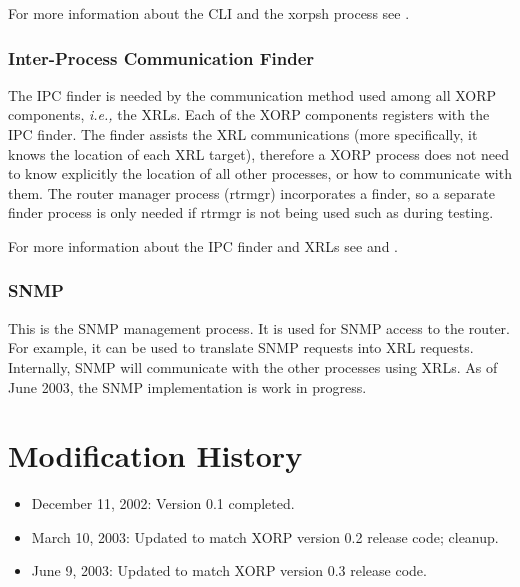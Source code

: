 \documentclass[11pt]{article}
\newcommand{\ie}{\emph{i.e.,}\xspace}
\begin{document}
For more information about the CLI and the xorpsh process see
\cite{xorp:rtrmgr}.

\subsubsection{Inter-Process Communication Finder}

The IPC finder is needed by the communication method used among all
XORP components, \ie the XRLs. Each of the XORP components registers
with the IPC finder. The finder assists the XRL communications (more
specifically, it knows the location of each XRL target), therefore a
XORP process does not need to know explicitly the location of all
other processes, or how to communicate with them.  The router manager
process (rtrmgr) incorporates a finder, so a separate finder process
is only needed if rtrmgr is not being used such as during testing.

For more information about the IPC finder and XRLs see
\cite{xorp:xrl} and \cite{xorp:xrl_interfaces}.

\subsubsection{SNMP}

This is the SNMP management process. It is used for SNMP access to the
router. For example, it can be used to translate SNMP requests into XRL
requests. Internally, SNMP will communicate with the other processes
using XRLs.
As of June 2003, the SNMP implementation is work in progress.


\appendix
\section{Modification History}

\begin{itemize}

  \item December 11, 2002: Version 0.1 completed.
  \item March 10, 2003: Updated to match XORP version 0.2 release code;
  cleanup.
  \item June 9, 2003: Updated to match XORP version 0.3 release code.

\end{itemize}





\end{document}
